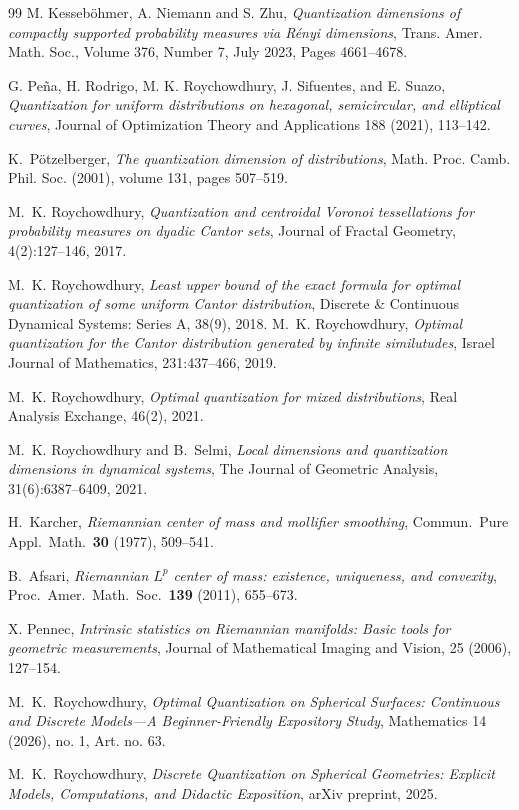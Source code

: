 \documentclass[12pt, reqno]{amsart}
\theoremstyle{plain}
\theoremstyle{definition}
\begin{document}
\begin{thebibliography}{99}
  M. Kesseb\"ohmer, A. Niemann and S. Zhu, \emph{Quantization dimensions of compactly supported probability measures via R\'enyi dimensions}, Trans. Amer. Math. Soc., Volume 376, Number 7, July 2023, Pages 4661--4678. 


 G. Peña, H. Rodrigo, M. K. Roychowdhury, J. Sifuentes, and E. Suazo, \emph{Quantization for uniform distributions on hexagonal, semicircular, and elliptical curves}, Journal of Optimization Theory and Applications 188 (2021), 113--142.

K.~P\"otzelberger, 
\emph{The quantization dimension of distributions}, Math. Proc. Camb. Phil. Soc. (2001), volume 131, pages 507--519. 

 
M.~K. Roychowdhury, \emph{Quantization and centroidal {V}oronoi tessellations for probability
  measures on dyadic {C}antor sets}, 
 Journal of Fractal Geometry, 4(2):127--146, 2017.

M.~K. Roychowdhury, \emph{Least upper bound of the exact formula for optimal quantization of
  some uniform {C}antor distribution}, 
 Discrete \& Continuous Dynamical Systems: Series A, 38(9),
  2018.
M.~K. Roychowdhury, \emph{Optimal quantization for the Cantor distribution generated by
  infinite similutudes}, Israel Journal of Mathematics, 231:437--466, 2019.

M.~K. Roychowdhury, \emph{Optimal quantization for mixed distributions}, 
 Real Analysis Exchange, 46(2), 2021.

M.~K. Roychowdhury and B.~Selmi, \emph{Local dimensions and quantization dimensions in dynamical systems}, 
The Journal of Geometric Analysis, 31(6):6387--6409, 2021.



H.~Karcher, \emph{Riemannian center of mass and mollifier smoothing},
Commun.\ Pure Appl.\ Math.\ \textbf{30} (1977), 509--541.


B.~Afsari, \emph{Riemannian $L^p$ center of mass: existence, uniqueness, and
convexity}, Proc.\ Amer.\ Math.\ Soc.\ \textbf{139} (2011), 655--673.

X. Pennec,
\emph{Intrinsic statistics on Riemannian manifolds: Basic tools for geometric measurements},
Journal of Mathematical Imaging and Vision, 25 (2006), 127--154.


M.~K.~Roychowdhury, \emph{Optimal Quantization on Spherical Surfaces:
Continuous and Discrete Models---A Beginner-Friendly Expository Study},
Mathematics 14 (2026), no. 1, Art. no. 63.

M.~K.~Roychowdhury, \emph{Discrete Quantization on Spherical Geometries:
Explicit Models, Computations, and Didactic Exposition}, arXiv preprint, 2025.





\end{thebibliography}
 
\end{document}
